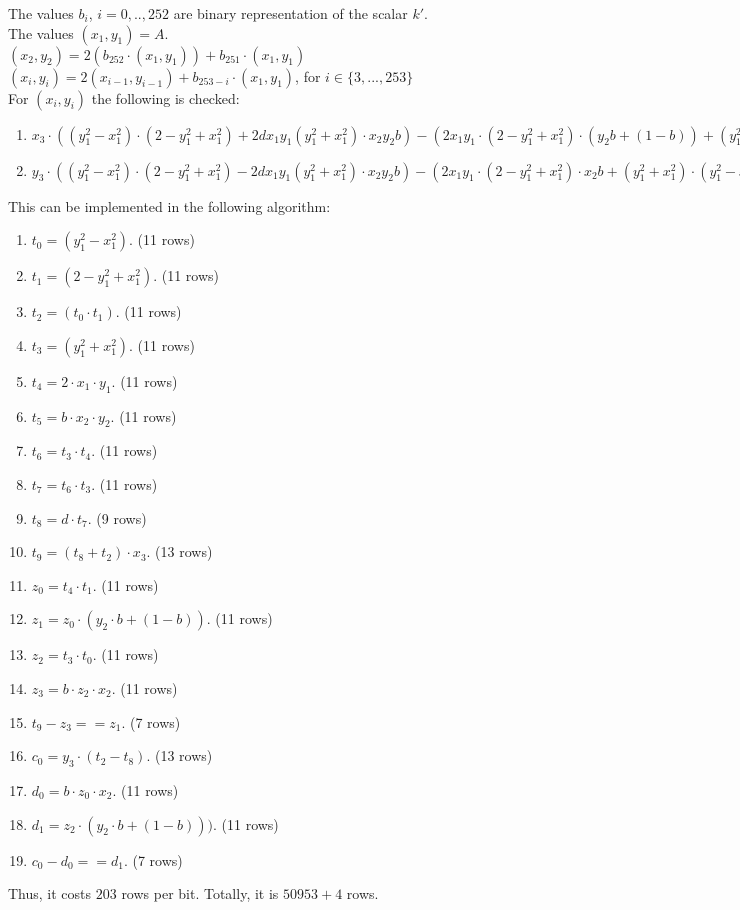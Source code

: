 The values $b_i$, $i = 0,.., 252$ are binary representation of the scalar $k'$.\\
The values $(x_1, y_1) = A$.\\
$(x_2, y_2) = 2 (b_{252} \cdot (x_1, y_1)) + b_{251} \cdot (x_1, y_1)$ \\
$(x_i, y_i) = 2 (x_{i - 1}, y_{i - 1}) + b_{253 - i} \cdot (x_1, y_1)$, for $i \in \{ 3,..., 253\}$ \\
For $(x_i, y_i)$ the following is checked:
\begin{enumerate}
    \item $x_3 \cdot ((y_1^2 - x_1^2)\cdot(2 - y_1^2 + x_1^2) + 2dx_1y_1(y_1^2+x_1^2) \cdot x_2y_2b ) - (2x_1y_1\cdot(2 - y_1^2 +x_1^2)\cdot (y_2b + (1 - b)) + (y_1^2 + x_1^2)\cdot(y_1^2 - x_1^2)\cdot x_2 b)$
    \item $y_3 \cdot ((y_1^2 - x_1^2)\cdot(2 - y_1^2 + x_1^2) - 2dx_1y_1(y_1^2+x_1^2) \cdot x_2y_2b ) - (2x_1y_1\cdot(2 - y_1^2 +x_1^2)\cdot x_2b + (y_1^2 + x_1^2)\cdot(y_1^2 - x_1^2)\cdot (y_2b + (1 - b)))$
\end{enumerate}
This can be implemented in the following algorithm:
\begin{enumerate}
\item $t_0 = (y_1^2 - x_1^2)$. (11 rows)
\item $t_1 = (2 - y_1^2 + x_1^2)$. (11 rows)
\item $t_2 = (t_0 \cdot t_1)$. (11 rows)
\item $t_3 = (y_1^2 + x_1^2)$. (11 rows)
\item $t_4 = 2 \cdot x_1 \cdot y_1$. (11 rows)
\item $t_5 = b \cdot x_2 \cdot y_2$. (11 rows)
\item $t_6 = t_3 \cdot t_4$. (11 rows)
\item $t_7 = t_6 \cdot t_3$. (11 rows)
\item $t_8 = d \cdot t_7$. (9 rows)
\item $t_9 = (t_8 + t_2) \cdot x_3$. (13 rows)
\item $z_0 = t_4 \cdot t_1$. (11 rows)
\item $z_1 = z_0 \cdot (y_2\cdot b + (1 - b))$. (11 rows)
\item $z_2 = t_3 \cdot t_0$. (11 rows)
\item $z_3 = b \cdot z_2 \cdot x_2$. (11 rows)
\item $t_9 - z_3 == z_1$. (7 rows)

\item $c_0 = y_3 \cdot (t_2 - t_8)$. (13 rows)
\item $d_0 = b \cdot z_0 \cdot x_2$. (11 rows)
\item $d_1 =  z_2 \cdot (y_2 \cdot b + (1-b)))$. (11 rows)
\item $c_0 - d_0 == d_1$. (7 rows)
\end{enumerate}

Thus, it costs $203$ rows per bit. 
Totally, it is $50 953 + 4 $ rows.